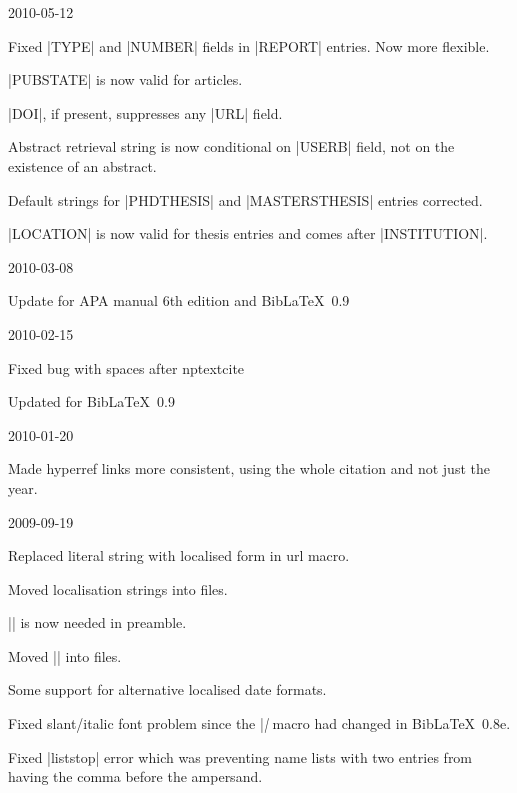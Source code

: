\documentclass{ltxdockit}
\begin{document}
\begin{changelog}
\begin{release}{1.0}{2010-05-12}
\item Fixed |TYPE| and |NUMBER| fields in |REPORT| entries. Now more
  flexible.
\item |PUBSTATE| is now valid for articles.
\item |DOI|, if present, suppresses any |URL| field.
\item Abstract retrieval string is now conditional on |USERB| field, not on
  the existence of an abstract.
\item Default strings for |PHDTHESIS| and |MASTERSTHESIS| entries corrected.
\item |LOCATION| is now valid for thesis entries and comes after |INSTITUTION|.
\end{release}

\begin{release}{0.9}{2010-03-08}
\item Update for APA manual 6th edition and Bib\LaTeX\ 0.9
\end{release}

\begin{release}{0.8}{2010-02-15}
\item Fixed bug with spaces after nptextcite
\item Updated for Bib\LaTeX\ 0.9
\end{release}

\begin{release}{0.7}{2010-01-20}
\item Made hyperref links more consistent, using the whole citation and not
  just the year.
\end{release}


\begin{release}{0.5}{2009-09-19}
\item Replaced literal string with localised form in url macro.
\item Moved localisation strings into  files.
\item |\DeclareLanguageMapping| is now needed in preamble.
\item Moved |\DeclareBibliographyExtras| into  files.
\item Some support for alternative localised date formats.
\item Fixed slant/italic font problem since the |\mkbibemph| macro had
  changed in Bib\LaTeX\ 0.8e.
\item Fixed |liststop| error which was preventing name lists with two
  entries from having the comma before the ampersand.
\end{release}


\end{changelog}
\end{document}
